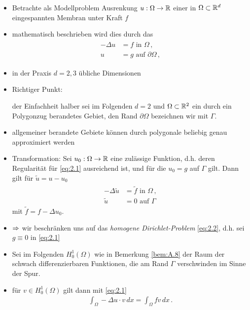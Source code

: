 \begin{itemize}
\item Betrachte als Modellproblem Ausrenkung $u: \Omega \rightarrow \mathbb{R}$ einer in $\Omega \subset \mathbb{R}^d$ eingespannten Membran unter Kraft $f$
\item mathematisch beschrieben wird dies durch das \textit{}
\begin{align}\label{eq:2.1}
\begin{aligned}
	-\Delta u &= f \text{ in } \Omega \, ,\\
	u & = g \text{ auf } \partial \Omega \, ,
\end{aligned}
\end{align}
\item in der Praxis $d = 2,3$ übliche Dimensionen
\item Richtiger Punkt: \begin{notation} 
der Einfachheit halber sei im Folgenden $d = 2$ und $\Omega \subset \mathbb{R}^2$ ein durch ein Polygonzug berandetes Gebiet, den Rand $\partial \Omega$ bezeichnen wir mit $\Gamma$.
\end{notation}
\item allgemeiner berandete Gebiete können durch polygonale beliebig genau approximiert werden
\item Transformation: Sei $u_0: \Omega \rightarrow \mathbb{R}$ eine zulässige Funktion, d.h. deren Regularität für \eqref{eq:2.1} ausreichend ist, und für die $u_0 = g$ auf $\Gamma$ gilt. Dann gilt für 
$\tilde u = u-u_0$
\begin{align}\label{eq:2.2}
\begin{aligned}
	-\Delta \tilde u &= \tilde f \text{ in } \Omega \, ,\\
	\tilde u & = 0 \text{ auf } \Gamma 
\end{aligned}
\end{align}
mit $\tilde f = f-\Delta u_0$.
\item $\Rightarrow$ wir beschränken uns auf das \textit{homogene Dirichlet-Problem} \eqref{eq:2.2}, d.h. sei $g\equiv 0$ in \eqref{eq:2.1}
\item Sei im Folgenden $H^1_0 (\Omega)$ wie in Bemerkung \ref{bem:A.8} der Raum der schwach differenzierbaren Funktionen, die am Rand $\Gamma$ verschwinden im Sinne der Spur.
\item für $v \in H^1_0(\Omega)$ gilt dann mit \eqref{eq:2.1}
\begin{align*}
	\int_\Omega -\Delta u \cdot v \, dx = \int_\Omega f v \, dx \, .
\end{align*}

\end{itemize}
